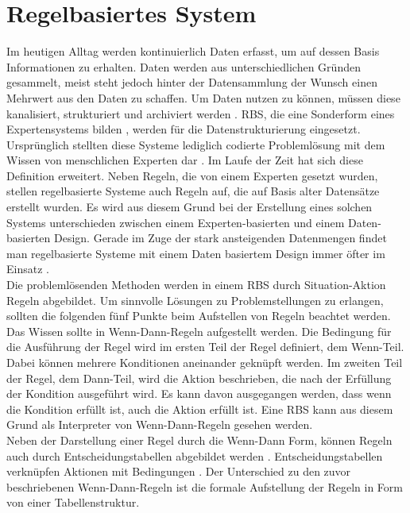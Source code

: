 \section{Regelbasiertes System} 
Im heutigen Alltag werden kontinuierlich Daten erfasst, um auf dessen Basis Informationen zu erhalten. Daten werden aus unterschiedlichen Gründen gesammelt, meist steht jedoch hinter der Datensammlung der Wunsch einen Mehrwert aus den Daten zu schaffen. Um Daten nutzen zu können, müssen diese kanalisiert, strukturiert und archiviert werden \cite{managermagazin:datensammlung}. \ac{RBS}, die eine Sonderform eines Expertensystems bilden \cite{ieee:ruleBasedSystemAndNetworks}, werden für die Datenstrukturierung eingesetzt. Ursprünglich stellten diese Systeme lediglich codierte Problemlösung mit dem Wissen von menschlichen Experten dar \cite{Hayes-Roth:1985:RS:4284.4286}. Im Laufe der Zeit hat sich diese Definition erweitert. Neben Regeln, die von einem Experten gesetzt wurden, stellen regelbasierte Systeme auch Regeln auf, die auf Basis alter Datensätze erstellt wurden. Es wird aus diesem Grund bei der Erstellung eines solchen Systems unterschieden zwischen einem Experten-basierten und einem Daten-basierten Design. Gerade im Zuge der stark ansteigenden Datenmengen findet man regelbasierte Systeme mit einem Daten basiertem Design immer öfter im Einsatz \cite{ieee:ruleBasedSystemAndNetworks}.\\
Die problemlösenden Methoden werden in einem \ac{RBS} durch Situation-Aktion Regeln abgebildet. Um sinnvolle Lösungen zu Problemstellungen zu erlangen, sollten die folgenden fünf Punkte beim Aufstellen von Regeln beachtet werden.\\
Das Wissen sollte in Wenn-Dann-Regeln aufgestellt werden. Die Bedingung für die Ausführung der Regel wird im ersten Teil der Regel definiert, dem Wenn-Teil. Dabei können mehrere Konditionen aneinander geknüpft werden. Im zweiten Teil der Regel, dem Dann-Teil, wird die Aktion beschrieben, die nach der Erfüllung der Kondition ausgeführt wird. Es kann davon ausgegangen werden, dass wenn die Kondition erfüllt ist, auch die Aktion erfüllt ist. Eine \ac{RBS} kann aus diesem Grund als Interpreter von Wenn-Dann-Regeln gesehen werden\cite{oracle:JREAPI}.\\
Neben der Darstellung einer Regel durch die Wenn-Dann Form, können Regeln auch durch Entscheidungstabellen abgebildet werden \cite{HSAugsburg:RuleEngine}. Entscheidungstabellen verknüpfen Aktionen mit Bedingungen \cite{itwissen:entscheidungstabelle}. Der Unterschied zu den zuvor beschriebenen Wenn-Dann-Regeln ist die formale Aufstellung der Regeln in Form von einer Tabellenstruktur.\\
